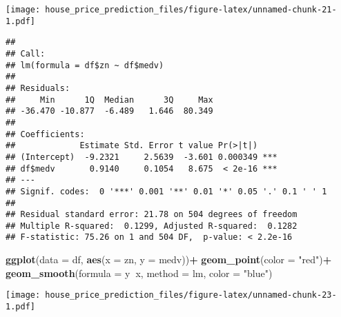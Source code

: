 \documentclass[
]{article}
\newenvironment{Shaded}{\begin{snugshade}}{\end{snugshade}}
\newcommand{\DataTypeTok}[1]{\textcolor[rgb]{0.13,0.29,0.53}{#1}}
\newcommand{\KeywordTok}[1]{\textcolor[rgb]{0.13,0.29,0.53}{\textbf{#1}}}
\newcommand{\NormalTok}[1]{#1}
\newcommand{\OperatorTok}[1]{\textcolor[rgb]{0.81,0.36,0.00}{\textbf{#1}}}
\newcommand{\StringTok}[1]{\textcolor[rgb]{0.31,0.60,0.02}{#1}}
\begin{document}
\texttt{[image: house\_price\_prediction\_files/figure-latex/unnamed-chunk-21-1.pdf]}

\begin{Shaded}
\end{Shaded}

\begin{verbatim}
## 
## Call:
## lm(formula = df$zn ~ df$medv)
## 
## Residuals:
##     Min      1Q  Median      3Q     Max 
## -36.470 -10.877  -6.489   1.646  80.349 
## 
## Coefficients:
##             Estimate Std. Error t value Pr(>|t|)    
## (Intercept)  -9.2321     2.5639  -3.601 0.000349 ***
## df$medv       0.9140     0.1054   8.675  < 2e-16 ***
## ---
## Signif. codes:  0 '***' 0.001 '**' 0.01 '*' 0.05 '.' 0.1 ' ' 1
## 
## Residual standard error: 21.78 on 504 degrees of freedom
## Multiple R-squared:  0.1299, Adjusted R-squared:  0.1282 
## F-statistic: 75.26 on 1 and 504 DF,  p-value: < 2.2e-16
\end{verbatim}

\begin{Shaded}
\begin{Highlighting}[]
\KeywordTok{ggplot}\NormalTok{(}\DataTypeTok{data =}\NormalTok{ df, }\KeywordTok{aes}\NormalTok{(}\DataTypeTok{x =}\NormalTok{ zn, }\DataTypeTok{y =}\NormalTok{ medv))}\OperatorTok{+}
\StringTok{  }\KeywordTok{geom_point}\NormalTok{(}\DataTypeTok{color =} \StringTok{"red"}\NormalTok{)}\OperatorTok{+}
\StringTok{  }\KeywordTok{geom_smooth}\NormalTok{(}\DataTypeTok{formula =}\NormalTok{ y}\OperatorTok{~}\NormalTok{x, }\DataTypeTok{method =}\NormalTok{ lm, }\DataTypeTok{color =} \StringTok{"blue"}\NormalTok{)}
\end{Highlighting}
\end{Shaded}

\texttt{[image: house\_price\_prediction\_files/figure-latex/unnamed-chunk-23-1.pdf]}

\begin{Shaded}
\end{Shaded}
\end{document}
